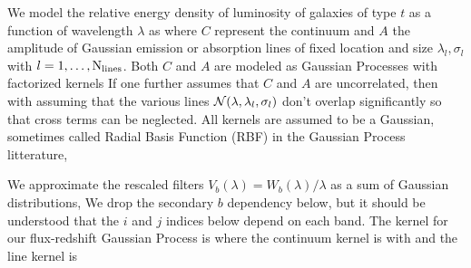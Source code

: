 \documentclass[aps,prd,showpacs,superscriptaddress,groupedaddress]{revtex4}  %
\begin{document}
We model the relative energy density of luminosity of galaxies of type $t$ as a function of wavelength $\lambda$ as
where $C$ represent the continuum and $A$ the amplitude of Gaussian emission or absorption lines of fixed location and size $ \lambda_l, \sigma_l$ with $l = 1, \ldots, {\rm N}_{\rm lines}$. Both $C$ and $A$ are modeled as Gaussian Processes with factorized kernels
If one further assumes that $C$ and $A$ are uncorrelated, then 
with 
assuming that the various lines $\mathcal{N}(\lambda, \lambda_l, \sigma_l)$ don't overlap significantly so that cross terms can be neglected. All kernels are assumed to be a Gaussian, sometimes called Radial Basis Function (RBF) in the Gaussian Process litterature,

We approximate the rescaled filters $V_b(\lambda) = W_b(\lambda)/\lambda$ as a sum of Gaussian distributions,
We drop the secondary $b$ dependency below, but it should be understood that the $i$ and $j$ indices below depend on each band.
The kernel for our flux-redshift Gaussian Process is
where the continuum kernel is
with
and the line kernel is
\end{document}
